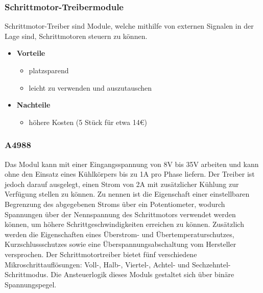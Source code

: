 \subsubsection{Schrittmotor-Treibermodule}
Schrittmotor-Treiber sind Module, welche mithilfe von externen Signalen in der Lage sind, Schrittmotoren steuern zu können.

\begin{itemize}
    \item \textbf{Vorteile}
    \begin{itemize}
        \item platzsparend
        \item leicht zu verwenden und auszutauschen
    \end{itemize}
    \item \textbf{Nachteile}
    \begin{itemize}
        \item höhere Kosten (5 Stück für etwa 14€)
    \end{itemize}
\end{itemize}

\subsubsection{A4988}
Das Modul kann mit einer Eingangsspannung von 8V bis 35V arbeiten und kann ohne den Einsatz eines Kühlkörpers bis zu 1A pro Phase liefern.
Der Treiber ist jedoch darauf ausgelegt, einen Strom von 2A mit zusätzlicher Kühlung zur Verfügung stellen zu können.
Zu nennen ist die Eigenschaft einer einstellbaren Begrenzung des abgegebenen Stroms über ein Potentiometer,
wodurch Spannungen über der Nennspannung des Schrittmotors verwendet werden können, um höhere Schrittgeschwindigkeiten erreichen zu können.
Zusätzlich werden die Eigenschaften eines Überstrom- und Übertemperaturschutzes, Kurzschlussschutzes sowie eine Überspannungsabschaltung vom Hersteller versprochen.
Der Schrittmotortreiber bietet fünf verschiedene Mikroschrittauflösungen: Voll-, Halb-, Viertel-, Achtel- und Sechzehntel-Schrittmodus.
Die Ansteuerlogik dieses Moduls gestaltet sich über binäre Spannungspegel.

